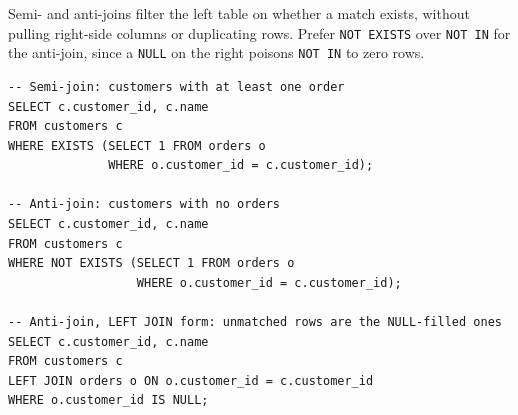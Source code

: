 Semi- and anti-joins filter the left table on whether a match exists, without
pulling right-side columns or duplicating rows. Prefer \texttt{NOT EXISTS} over
\texttt{NOT IN} for the anti-join, since a \texttt{NULL} on the right poisons
\texttt{NOT IN} to zero rows.

\begin{lstlisting}[style=sql, caption={Semi-join keeps matches, anti-join keeps non-matches}]
-- Semi-join: customers with at least one order
SELECT c.customer_id, c.name
FROM customers c
WHERE EXISTS (SELECT 1 FROM orders o
              WHERE o.customer_id = c.customer_id);

-- Anti-join: customers with no orders
SELECT c.customer_id, c.name
FROM customers c
WHERE NOT EXISTS (SELECT 1 FROM orders o
                  WHERE o.customer_id = c.customer_id);

-- Anti-join, LEFT JOIN form: unmatched rows are the NULL-filled ones
SELECT c.customer_id, c.name
FROM customers c
LEFT JOIN orders o ON o.customer_id = c.customer_id
WHERE o.customer_id IS NULL;
\end{lstlisting}